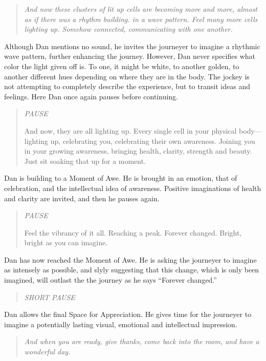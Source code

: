 \documentclass[12pt]{book}
\begin{document}
\begin{quote}{\em
And now these clusters of lit up cells are becoming more and more, almost
as if there was a rhythm building.
in a wave pattern. Feel many more cells lighting up. Somehow connected,
communicating with one another.
}\end{quote}

Although Dan mentions no sound, he invites the journeyer to imagine a rhythmic wave pattern, further enhancing the journey. However, Dan never specifies what color the light given off is. To one, it might be white, to another golden, to another different hues depending on where they are in the body. The jockey is not attempting to completely describe the experience, but to transit ideas and feelings. Here Dan once again pauses before continuing.


\begin{quote}{\em
  PAUSE



And now, they are all lighting up. Every single cell in your physical
body---lighting up, celebrating you, celebrating their own awareness.
Joining you in your growing awareness, bringing health, clarity,
strength and beauty. Just sit soaking that up for a moment.
  }\end{quote}

Dan is building to a Moment of Awe. He is brought in an emotion, that of celebration, and the intellectual idea of awareness. Positive imaginations of health and clarity are invited, and then he pauses again.

\begin{quote}{\em
PAUSE

Feel the vibrancy of it all. Reaching a peak. Forever changed.
Bright, bright as you can imagine.
  }\end{quote}


Dan has now reached the Moment of Awe. He is asking the journeyer to imagine as intensely as possible, and slyly suggesting that this change, which is only been imagined, will outlast the the journey as he says “Forever changed.”

\begin{quote}{\em
  SHORT PAUSE
  }\end{quote}

Dan allows the final Space for Appreciation. He gives time for the journeyer to imagine a potentially lasting visual, emotional and intellectual impression.


\begin{quote}{\em
And when you are ready, give thanks, come back into the room,
and have a wonderful day.
}\end{quote}
\end{document}
